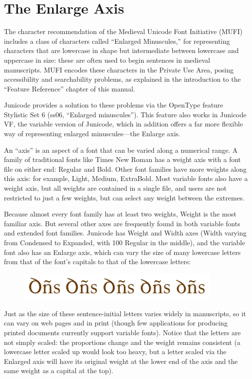 \chapter{The Enlarge Axis}

The character recommendation of the Medieval Unicode Font Initiative (MUFI) includes a class of characters called
“Enlarged Minuscules,” for representing characters that are lowercase in shape but intermediate between lowercase 
and uppercase in size: these are often used to begin sentences in medieval manuscripts. MUFI encodes these characters 
in the Private Use Area, posing accessibility and searchability problems, as explained in the introduction to the 
“Feature Reference” chapter of this manual.

Junicode provides a solution to these problems via the OpenType feature Stylistic Set 6 (ss06, “Enlarged minuscules”). 
This feature also works in Junicode VF, the variable version of Junicode, which in addition offers a far more flexible 
way of representing enlarged minuscules—the Enlarge axis.

An “axis” is an aspect of a font that can be varied along a numerical range. A family of traditional fonts like Times 
New Roman has a weight axis with a font file on either end: Regular and Bold. Other font families have more weights 
along this axis: for example, Light, Medium, ExtraBold. Most variable fonts also have a weight axis, but all weights 
are contained in a single file, and users are not restricted to just a few weights, but can select any weight between 
the extremes.

Because almost every font family has at least two weights, Weight is the most familiar axis. But several other axes are 
frequently found in both variable fonts and extended font families. Junicode has Weight and Width axes (Width varying 
from { Condensed} to { Expanded}, with 100 Regular in the middle), and the variable font also has 
an Enlarge axis, which can vary the size of many lowercase letters from that of the font's capitals to that of the 
lowercase letters:
\begin{figure}[h!]
  \centering\includegraphics[width=4in]{dns.png}
\end{figure}
Just as the size of these sentence-initial letters varies widely in manuscripts, so it can vary on web pages and in 
print (though few applications for producing printed documents currently support variable fonts). Notice that the letters 
are not simply scaled: the proportions change and the weight remains consistent (a lowercase letter scaled up would look 
too heavy, but a letter scaled via the Enlarged axis will have its original weight at the lower end of the axis and the 
same weight as a capital at the top).

